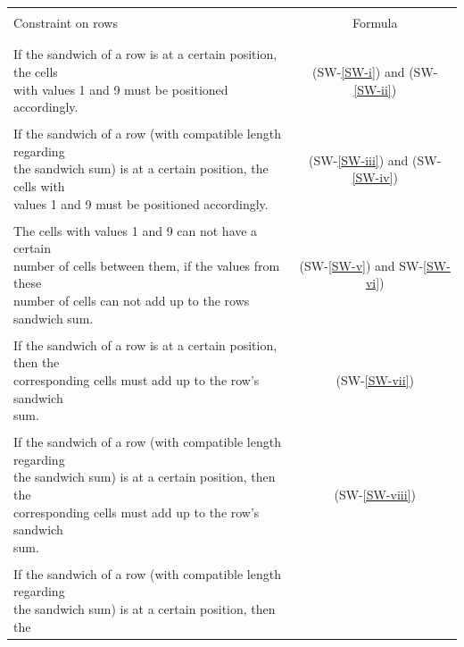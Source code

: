 \begin{table}
    \centering
    \begin{tabular*}{\textwidth}{l @{\extracolsep{\fill}} c}
        \hline
        \\
        Constraint on rows & Formula\\
        \\
        \hline
        \\
        \makecell[cl]{If the sandwich of a row is at a certain position, the cells\\
        with values 1 and 9 must be positioned accordingly.} & (SW-\ref{SW-i}) and (SW-\ref{SW-ii})\\
        \\
        \makecell[cl]{If the sandwich of a row (with compatible length regarding\\
        the sandwich sum) is at a certain position, the cells with\\
        values 1 and 9 must be positioned accordingly.} & (SW-\ref{SW-iii}) and (SW-\ref{SW-iv})\\
        \\
        \makecell[cl]{The cells with values 1 and 9 can not have a certain\\
        number of cells between them, if the values from these\\
        number of cells can not add up to the rows sandwich sum.} & (SW-\ref{SW-v}) and SW-\ref{SW-vi})\\
        \\
        \makecell[cl]{If the sandwich of a row is at a certain position, then the\\
        corresponding cells must add up to the row's sandwich\\
        sum.} & (SW-\ref{SW-vii})\\
        \\
        \makecell[cl]{If the sandwich of a row (with compatible length regarding\\
        the sandwich sum) is at a certain position, then the\\
        corresponding cells must add up to the row's sandwich\\
        sum.} & (SW-\ref{SW-viii})\\
        \\
        \makecell[cl]{If the sandwich of a row (with compatible length regarding\\
        the sandwich sum) is at a certain position, then the\\
}
\end{tabular*}
\end{table}
